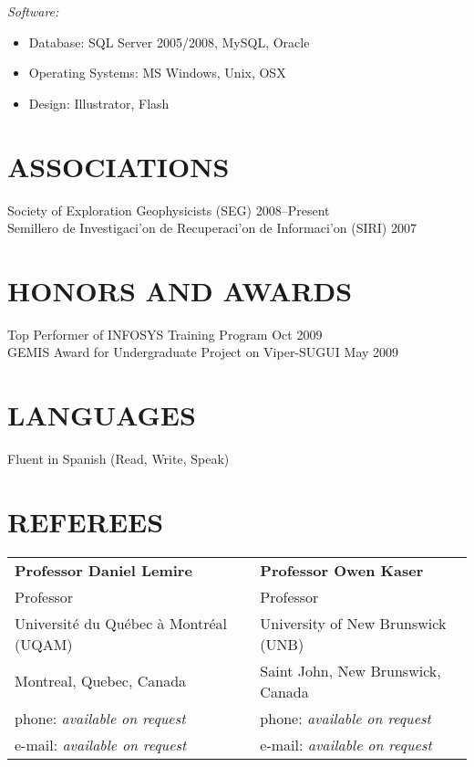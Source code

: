 \documentclass[line,margin]{res}
\begin{document}
\begin{resume}
    {\sl Software:}
    \begin{itemize} \itemsep -2pt
        \item Database: SQL Server 2005/2008, MySQL, Oracle
        \item Operating Systems: MS Windows, Unix, OSX
        \item Design: Illustrator, Flash
    \end{itemize} 

\section{ ASSOCIATIONS} %
\label{sec:associations}
    Society of Exploration Geophysicists (SEG) \hfill 2008--Present\\
    Semillero de Investigaci\a'on de Recuperaci\a'on de Informaci\a'on (SIRI) \hfill 2007\\

\section{ HONORS AND AWARDS} %
\label{sec:honors_and_awards}
    Top Performer of INFOSYS Training Program \hfill Oct 2009\\
    GEMIS Award for Undergraduate Project on Viper-SUGUI \hfill May 2009\\

\section{ LANGUAGES} %
\label{sec:languages}
    Fluent in Spanish (Read, Write, Speak)


\section{REFEREES} %
\label{sec:referees}

\begin{tabular}{@{}p{6cm}p{6cm}}
\textbf{Professor Daniel Lemire}        &  \textbf{Professor Owen Kaser}            \\
Professor                               &  Professor                                \\
Université du Québec à Montréal (UQAM)  &  University of New Brunswick (UNB)        \\
Montreal, Quebec, Canada                &  Saint John, New Brunswick, Canada        \\
phone: \textsl{available on request}    &  phone: \textsl{available on request}     \\
e-mail: \textsl{available on request}   &  e-mail: \textsl{available on request}    \\
\end{tabular}


\end{resume}
\end{document}
